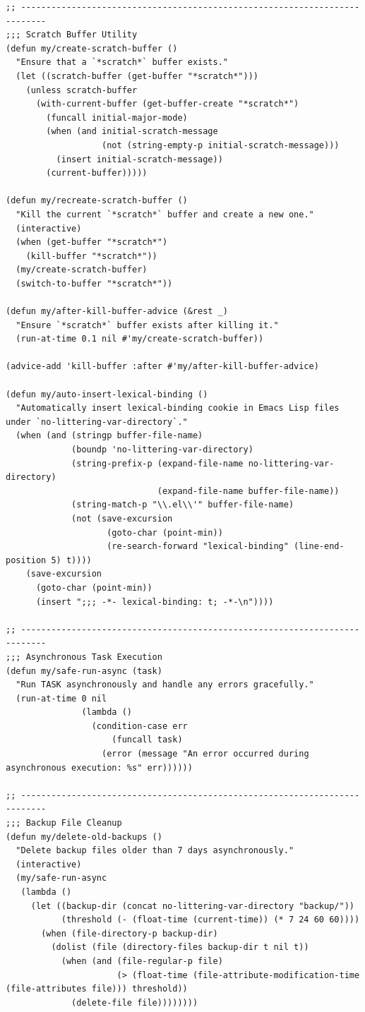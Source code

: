 \documentclass[11pt]{article}
\begin{document}
\begin{verbatim}
;; ---------------------------------------------------------------------------
;;; Scratch Buffer Utility
(defun my/create-scratch-buffer ()
  "Ensure that a `*scratch*` buffer exists."
  (let ((scratch-buffer (get-buffer "*scratch*")))
    (unless scratch-buffer
      (with-current-buffer (get-buffer-create "*scratch*")
        (funcall initial-major-mode)
        (when (and initial-scratch-message
                   (not (string-empty-p initial-scratch-message)))
          (insert initial-scratch-message))
        (current-buffer)))))

(defun my/recreate-scratch-buffer ()
  "Kill the current `*scratch*` buffer and create a new one."
  (interactive)
  (when (get-buffer "*scratch*")
    (kill-buffer "*scratch*"))
  (my/create-scratch-buffer)
  (switch-to-buffer "*scratch*"))

(defun my/after-kill-buffer-advice (&rest _)
  "Ensure `*scratch*` buffer exists after killing it."
  (run-at-time 0.1 nil #'my/create-scratch-buffer))

(advice-add 'kill-buffer :after #'my/after-kill-buffer-advice)

(defun my/auto-insert-lexical-binding ()
  "Automatically insert lexical-binding cookie in Emacs Lisp files under `no-littering-var-directory`."
  (when (and (stringp buffer-file-name)
             (boundp 'no-littering-var-directory)
             (string-prefix-p (expand-file-name no-littering-var-directory)
                              (expand-file-name buffer-file-name))
             (string-match-p "\\.el\\'" buffer-file-name)
             (not (save-excursion
                    (goto-char (point-min))
                    (re-search-forward "lexical-binding" (line-end-position 5) t))))
    (save-excursion
      (goto-char (point-min))
      (insert ";;; -*- lexical-binding: t; -*-\n"))))

;; ---------------------------------------------------------------------------
;;; Asynchronous Task Execution
(defun my/safe-run-async (task)
  "Run TASK asynchronously and handle any errors gracefully."
  (run-at-time 0 nil
               (lambda ()
                 (condition-case err
                     (funcall task)
                   (error (message "An error occurred during asynchronous execution: %s" err))))))

;; ---------------------------------------------------------------------------
;;; Backup File Cleanup
(defun my/delete-old-backups ()
  "Delete backup files older than 7 days asynchronously."
  (interactive)
  (my/safe-run-async
   (lambda ()
     (let ((backup-dir (concat no-littering-var-directory "backup/"))
           (threshold (- (float-time (current-time)) (* 7 24 60 60))))
       (when (file-directory-p backup-dir)
         (dolist (file (directory-files backup-dir t nil t))
           (when (and (file-regular-p file)
                      (> (float-time (file-attribute-modification-time (file-attributes file))) threshold))
             (delete-file file))))))))


\end{verbatim}
\end{document}
